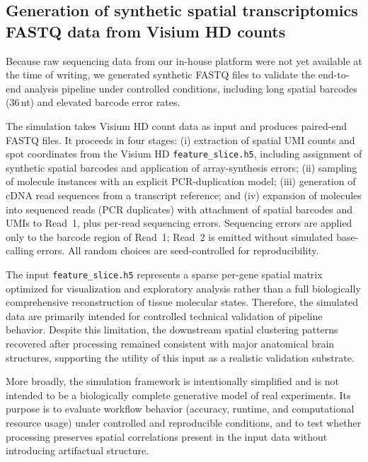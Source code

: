 
\subsection{Generation of synthetic spatial transcriptomics FASTQ data from Visium HD counts}
\label{sec:methods_simulation}

Because raw sequencing data from our in-house platform were not yet available at the time of writing, we generated synthetic FASTQ files to validate the end-to-end analysis pipeline under controlled conditions, including long spatial barcodes (36\,nt) and elevated barcode error rates.

The simulation takes Visium HD count data as input and produces paired-end FASTQ files. It proceeds in four stages: (i) extraction of spatial UMI counts and spot coordinates from the Visium HD \texttt{feature\_slice.h5}, including assignment of synthetic spatial barcodes and application of array-synthesis errors; (ii) sampling of molecule instances with an explicit PCR-duplication model; (iii) generation of cDNA read sequences from a transcript reference; and (iv) expansion of molecules into sequenced reads (PCR duplicates) with attachment of spatial barcodes and UMIs to Read~1, plus per-read sequencing errors. Sequencing errors are applied only to the barcode region of Read~1; Read~2 is emitted without simulated base-calling errors. All random choices are seed-controlled for reproducibility.

The input \texttt{feature\_slice.h5} represents a sparse per-gene spatial matrix optimized for visualization and exploratory analysis rather than a full biologically comprehensive reconstruction of tissue molecular states. Therefore, the simulated data are primarily intended for controlled technical validation of pipeline behavior. Despite this limitation, the downstream spatial clustering patterns recovered after processing remained consistent with major anatomical brain structures, supporting the utility of this input as a realistic validation substrate.

More broadly, the simulation framework is intentionally simplified and is not intended to be a biologically complete generative model of real experiments. Its purpose is to evaluate workflow behavior (accuracy, runtime, and computational resource usage) under controlled and reproducible conditions, and to test whether processing preserves spatial correlations present in the input data without introducing artifactual structure.

